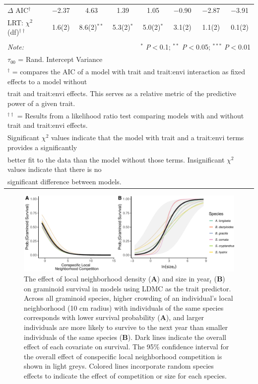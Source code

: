 \documentclass[12pt, letterpaper]{article}
\begin{document}
\begin{table}[h]
{\begin{tabular}{lccccccc}
\hline 
\rowcolor[gray]{.95}$\Delta$ AIC$^\dagger$ & $-$2.37 & 4.63 & 1.39 & 1.05 & $-$0.90 & $-$2.87 & $-$3.91 \\
LRT:  $\chi^2$(df)$^{\dagger\dagger}$ &
1.6(2) & 8.6(2)$^{**}$ & 5.3(2)$^{*}$ & 5.0(2)$^{*}$ & 3.1(2) & 1.1(2) & 0.1(2)\\
\hline 
\hline \\[-1.8ex] 
\textit{Note:} & \multicolumn{7}{r}{$^{*}$ \textit{P}$<$0.1; $^{**}$ \textit{P}$<$0.05; $^{***}$ \textit{P}$<$0.01} \\ 
\multicolumn{8}{l}{$\tau_{00}$ = Rand. Intercept Variance}\\
\multicolumn{8}{l}{$^\dagger$ = compares the AIC of a model with trait and trait:envi interaction as fixed effects to a model without}\\
\multicolumn{8}{l}{trait and trait:envi effects. This serves as a relative metric of the predictive power of a given trait.}\\
\multicolumn{8}{l}{$^{\dagger\dagger}$ = Results from a likelihood ratio test comparing models with and without trait and trait:envi effects.}\\
\multicolumn{8}{l}{Significant $\chi^2$ values indicate that the model with trait and a trait:envi terms provides a significantly }\\
\multicolumn{8}{l}{better fit to the data than the model without those terms. Insignificant $\chi^2$ values indicate that there is no}\\
\multicolumn{8}{l}{significant difference between models.}
\end{tabular} }
\end{table} 

\begin{figure}[h]
  \centering
  \includegraphics[width=.8\textwidth]{survEffectPlots-1.pdf}
  \caption{\internallinenumbers The effect of local neighborhood density (\textbf{A}) and size in year$_\textit{t}$ (\textbf{B}) on graminoid survival in models using LDMC as the trait predictor. Across all graminoid species, higher crowding of an individual’s local neighborhood (10 cm radius) with individuals of the same species corresponds with lower survival probability (\textbf{A}), and larger individuals are more likely to survive to the next year than smaller individuals of the same species (\textbf{B}). Dark lines indicate the overall effect of each covariate on survival. The 95\% confidence interval for the overall effect of conspecific local neighborhood competition is shown in light greys. Colored lines incorporate random species effects to indicate the effect of competition or size for each species.}
  \label{fig:Effects_Survival}
\end{figure}
\end{document}
